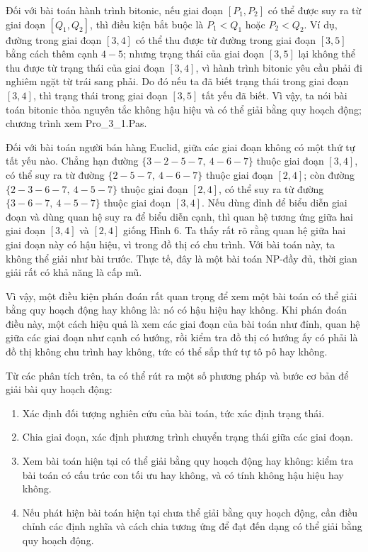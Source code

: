 \documentclass[11pt]{article}
\begin{document}
Đối với bài toán hành trình bitonic, nếu giai đoạn \([P_1,P_2]\) có thể được
suy ra từ giai đoạn \([Q_1,Q_2]\), thì điều kiện bắt buộc là
\(P_1<Q_1\) hoặc \(P_2<Q_2\). Ví dụ, đường trong giai đoạn \([3,4]\) có thể
thu được từ đường trong giai đoạn \([3,5]\) bằng cách thêm cạnh \(4-5\);
nhưng trạng thái của giai đoạn \([3,5]\) lại không thể thu được từ trạng thái
của giai đoạn \([3,4]\), vì hành trình bitonic yêu cầu phải đi nghiêm ngặt từ
trái sang phải. Do đó nếu ta đã biết trạng thái trong giai đoạn \([3,4]\),
thì trạng thái trong giai đoạn \([3,5]\) tất yếu đã biết. Vì vậy, ta nói bài
toán bitonic thỏa nguyên tắc không hậu hiệu và có thể giải bằng quy hoạch
động; chương trình xem Pro\_3\_1.Pas.

Đối với bài toán người bán hàng Euclid, giữa các giai đoạn không có một thứ
tự tất yếu nào. Chẳng hạn đường
\(\{3-2-5-7,\ 4-6-7\}\) thuộc giai đoạn \([3,4]\), có thể suy ra từ đường
\(\{2-5-7,\ 4-6-7\}\) thuộc giai đoạn \([2,4]\); còn đường
\(\{2-3-6-7,\ 4-5-7\}\) thuộc giai đoạn \([2,4]\), có thể suy ra từ đường
\(\{3-6-7,\ 4-5-7\}\) thuộc giai đoạn \([3,4]\). Nếu dùng đỉnh để biểu diễn
giai đoạn và dùng quan hệ suy ra để biểu diễn cạnh, thì quan hệ tương ứng
giữa hai giai đoạn \([3,4]\) và \([2,4]\) giống Hình 6. Ta thấy rất rõ rằng
quan hệ giữa hai giai đoạn này có hậu hiệu, vì trong đồ thị có chu trình. Với
bài toán này, ta không thể giải như bài trước. Thực tế, đây là một bài toán
NP-đầy đủ, thời gian giải rất có khả năng là cấp mũ.

Vì vậy, một điều kiện phán đoán rất quan trọng để xem một bài toán có thể
giải bằng quy hoạch động hay không là: nó có hậu hiệu hay không. Khi phán
đoán điều này, một cách hiệu quả là xem các giai đoạn của bài toán như đỉnh,
quan hệ giữa các giai đoạn như cạnh có hướng, rồi kiểm tra đồ thị có hướng ấy
có phải là đồ thị không chu trình hay không, tức có thể sắp thứ tự tô pô hay
không.

Từ các phân tích trên, ta có thể rút ra một số phương pháp và bước cơ bản để
giải bài quy hoạch động:
\begin{enumerate}
  \item Xác định đối tượng nghiên cứu của bài toán, tức xác định trạng thái.
  \item Chia giai đoạn, xác định phương trình chuyển trạng thái giữa các giai
  đoạn.
  \item Xem bài toán hiện tại có thể giải bằng quy hoạch động hay không:
  kiểm tra bài toán có cấu trúc con tối ưu hay không, và có tính không hậu
  hiệu hay không.
  \item Nếu phát hiện bài toán hiện tại chưa thể giải bằng quy hoạch động,
  cần điều chỉnh các định nghĩa và cách chia tương ứng để đạt đến dạng có thể
  giải bằng quy hoạch động.
\end{enumerate}
\end{document}

